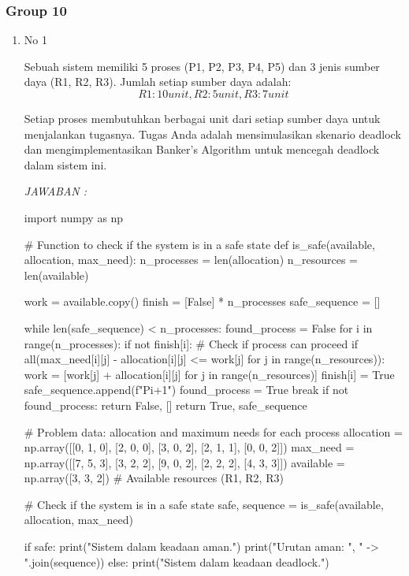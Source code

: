 \documentclass[12pt]{article}
\begin{document}
\subsubsection{Group 10}
\begin{enumerate}



    \item No 1


    
    Sebuah sistem memiliki 5 proses (P1, P2, P3, P4, P5) dan 3 jenis sumber daya (R1, R2, R3). Jumlah setiap sumber daya adalah:  
\[R1: 10 unit, R2: 5 unit, R3: 7 unit\]

Setiap proses membutuhkan berbagai unit dari setiap sumber daya untuk menjalankan tugasnya. Tugas Anda adalah mensimulasikan skenario deadlock dan mengimplementasikan Banker's Algorithm untuk mencegah deadlock dalam sistem ini.

\textit{JAWABAN : }
\begin{python}
import numpy as np

# Function to check if the system is in a safe state
def is_safe(available, allocation, max_need):
    n_processes = len(allocation)
    n_resources = len(available)
    
    work = available.copy()
    finish = [False] * n_processes
    safe_sequence = []
    
    while len(safe_sequence) < n_processes:
        found_process = False
        for i in range(n_processes):
            if not finish[i]:
                # Check if process can proceed
                if all(max_need[i][j] - allocation[i][j] <= work[j] for j in range(n_resources)):
                    work = [work[j] + allocation[i][j] for j in range(n_resources)]
                    finish[i] = True
                    safe_sequence.append(f"P{i+1}")
                    found_process = True
                    break
        if not found_process:
            return False, []
    return True, safe_sequence

# Problem data: allocation and maximum needs for each process
allocation = np.array([[0, 1, 0], [2, 0, 0], [3, 0, 2], [2, 1, 1], [0, 0, 2]])
max_need = np.array([[7, 5, 3], [3, 2, 2], [9, 0, 2], [2, 2, 2], [4, 3, 3]])
available = np.array([3, 3, 2])  # Available resources (R1, R2, R3)

# Check if the system is in a safe state
safe, sequence = is_safe(available, allocation, max_need)

if safe:
    print("Sistem dalam keadaan aman.")
    print("Urutan aman: ", " -> ".join(sequence))
else:
    print("Sistem dalam keadaan deadlock.")
\end{python}


\end{enumerate}
\end{document}
